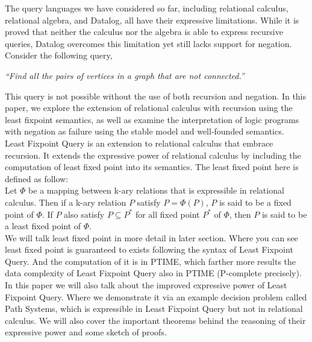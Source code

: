 The query languages we have considered so far, including relational calculus, 
relational algebra, and Datalog, all have their expressive limitations. While 
it is proved that neither the calculus nor the algebra is able to express 
recursive queries, Datalog overcomes this limitation yet still lacks support 
for negation. Consider the following query,
\begin{displayquote}
    \textit{``Find all the pairs of vertices in a 
    graph that are not connected.''}
\end{displayquote}
This query is not possible without the use of both recursion and negation. 
In this paper, we explore the extension of relational calculus with 
recursion using the least fixpoint semantics, as well as examine the interpretation  
of logic programs with negation as failure using the stable model 
and well-founded semantics.\\

Least Fixpoint Query is an extension to relational calculus that embrace recursion. It extends the expressive power of relational calculus by including the computation of least fixed point into its semantics. The least fixed point here is defined as follow: \\
Let $\Phi$ be a mapping between k-ary relations that is expressible in relational calculus. Then if a k-ary relation $P$ satisfy $P= \Phi(P)$, $P$ is said to be a fixed point of $\Phi$. If $P$ also satisfy $P \subseteq P^*$ for all fixed point $P^*$ of $\Phi$, then $P$ is said to be a least fixed point of $\Phi$.\\
We will talk least fixed point in more detail in later section. Where you can see least fixed point is guaranteed to exists following the syntax of Least Fixpoint Query. And the computation of it is in PTIME, which farther more results the data complexity of Least Fixpoint Query also in PTIME (P-complete precisely). 
In this paper we will also talk about the improved expressive power of Least Fixpoint Query. Where we demonstrate it via an example decision problem called Path Systems, which is expressible in Least Fixpoint Query but not in relational calculus. We will also cover the important theorems behind the reasoning of their expressive power and some sketch of proofs.\\


